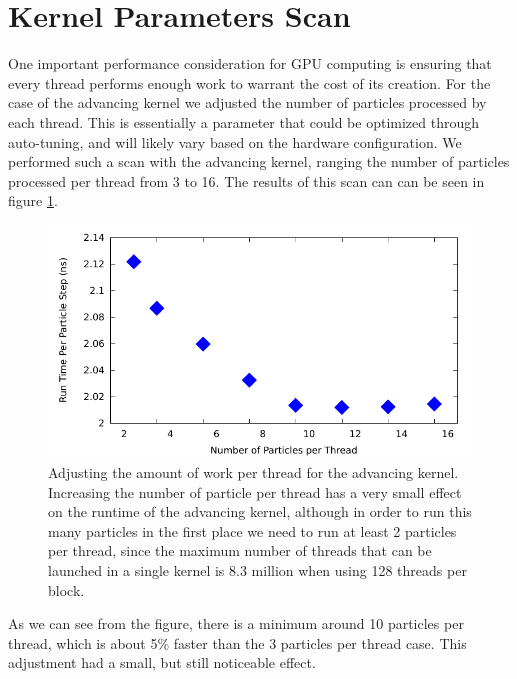 	\section{Kernel Parameters Scan}
One important performance consideration for GPU computing is ensuring that every thread performs enough work to warrant the cost of its creation. For the case of the advancing kernel we adjusted the number of particles processed by each thread. This is essentially a parameter that could be optimized through auto-tuning, and will likely vary based on the hardware configuration. We performed such a scan with the advancing kernel, ranging the number of particles processed per thread from 3 to 16. The results of this scan can can be seen in figure \ref{fig:kernel_param_scan}.

\begin{figure}[H]
\begin{center}
\includegraphics[width=6in]{performance/kernel_param.pdf}
\end{center}
\caption[Adjusting the amount of work per thread for the advancing kernel.]{Adjusting the amount of work per thread for the advancing kernel. Increasing the number of particle per thread has a very small effect on the runtime of the advancing kernel, although in order to run this many particles in the first place we need to run at least 2 particles per thread, since the maximum number of threads that can be launched in a single kernel is 8.3 million when using 128 threads per block.}
\label{fig:kernel_param_scan}
\end{figure}

As we can see from the figure, there is a minimum around 10 particles per thread, which is about 5\% faster than the 3 particles per thread case. This adjustment had a small, but still noticeable effect. 

